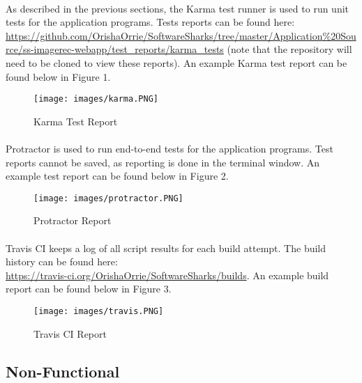 \documentclass[a4paper, 11pt]{article}
\begin{document}
    \paragraph{}
    As described in the previous sections, the Karma test runner is used to run unit tests for the application programs. Tests reports can be found here: \url{https://github.com/OrishaOrrie/SoftwareSharks/tree/master/Application\%20Source/ss-imagerec-webapp/test_reports/karma_tests} (note that the repository will need to be cloned to view these reports). An example Karma test report can be found below in Figure 1.\\
    
    \begin{figure}[H]
        \texttt{[image: images/karma.PNG]}
        \caption{Karma Test Report}
        \label{fig:karma_test}
    \end{figure}
    
    \paragraph{}
    Protractor is used to run end-to-end tests for the application programs. Test reports cannot be saved, as reporting is done in the terminal window. An example test report can be found below in Figure 2.\\
    \begin{figure}[H]
        \texttt{[image: images/protractor.PNG]}
        \caption{Protractor Report}
        \label{fig:prot_test}
    \end{figure}
    
    \paragraph{}
    Travis CI keeps a log of all script results for each build attempt. The build history can be found here:\\ \url{https://travis-ci.org/OrishaOrrie/SoftwareSharks/builds}. 
    An example build report can be found below in Figure 3.\\
    \begin{figure}[H]
        \texttt{[image: images/travis.PNG]}
        \caption{Travis CI Report}
        \label{fig:travis_test}
    \end{figure}
    
    \subsection{Non-Functional}
\end{document}
